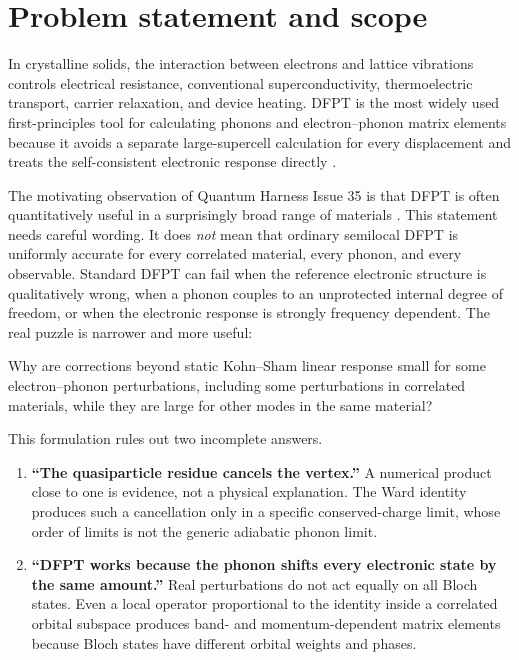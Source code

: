 \section{Problem statement and scope}
\label{sec:motivation}

In crystalline solids, the interaction between electrons and lattice vibrations
controls electrical resistance, conventional superconductivity, thermoelectric
transport, carrier relaxation, and device heating.  DFPT is the most widely used
first-principles tool for calculating phonons and electron--phonon matrix elements
because it avoids a separate large-supercell calculation for every displacement
and treats the self-consistent electronic response directly
\citep{Baroni2001,Gonze1995,Giustino2017}.

The motivating observation of Quantum Harness Issue 35 is that DFPT is often
quantitatively useful in a surprisingly broad range of materials
\citep{Issue35}.  This statement needs careful wording.  It does \emph{not} mean
that ordinary semilocal DFPT is uniformly accurate for every correlated material,
every phonon, and every observable.  Standard DFPT can fail when the reference
electronic structure is qualitatively wrong, when a phonon couples to an
unprotected internal degree of freedom, or when the electronic response is
strongly frequency dependent.  The real puzzle is narrower and more useful:

\begin{keypoint}
Why are corrections beyond static Kohn--Sham linear response small for some
electron--phonon perturbations, including some perturbations in correlated
materials, while they are large for other modes in the same material?
\end{keypoint}

This formulation rules out two incomplete answers.

\begin{enumerate}
  \item \textbf{``The quasiparticle residue cancels the vertex.''}  A numerical
  product close to one is evidence, not a physical explanation.  The Ward identity
  produces such a cancellation only in a specific conserved-charge limit, whose
  order of limits is not the generic adiabatic phonon limit.
  \item \textbf{``DFPT works because the phonon shifts every electronic state by
  the same amount.''}  Real perturbations do not act equally on all Bloch states.
  Even a local operator proportional to the identity inside a correlated orbital
  subspace produces band- and momentum-dependent matrix elements because Bloch
  states have different orbital weights and phases.
\end{enumerate}

